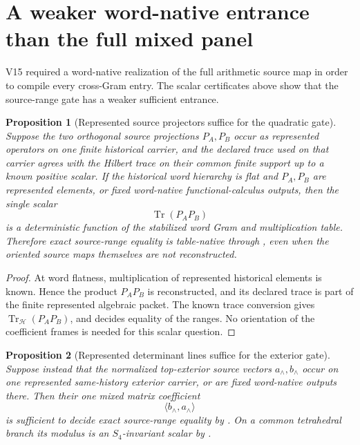 \documentclass[11pt]{article}
\newtheorem{proposition}[proposition]{Proposition}
\theoremstyle{definition}
\theoremstyle{remark}
\newcommand{\Tr}{\operatorname{Tr}}
\begin{document}
\section{A weaker word-native entrance than the full mixed panel}
\label{sec:v16-projector-word}

V15 required a word-native realization of the full arithmetic source map in
order to compile every cross-Gram entry.  The scalar certificates above show
that the source-range gate has a weaker sufficient entrance.

\begin{proposition}[Represented source projectors suffice for the quadratic gate]
\label{prop:v16-projector-native}
Suppose the two orthogonal source projections $P_A,P_B$ occur as represented
operators on one finite historical carrier, and the declared trace used on
that carrier agrees with the Hilbert trace on their common finite support up
to a known positive scalar.  If the historical word hierarchy is flat and
$P_A,P_B$ are represented elements, or fixed word-native functional-calculus
outputs, then the single scalar
\[
 \Tr(P_AP_B)
\]
is a deterministic function of the stabilized word Gram and multiplication
table.  Therefore exact source-range equality is table-native through
, even when the oriented source maps themselves
are not reconstructed.
\end{proposition}

\begin{proof}
At word flatness, multiplication of represented historical elements is known.
Hence the product $P_AP_B$ is reconstructed, and its declared trace is part of
the finite represented algebraic packet.  The known trace conversion gives
$\Tr_{\mathcal H}(P_AP_B)$, and
 decides equality of the ranges.  No
orientation of the coefficient frames is needed for this scalar question.
\end{proof}

\begin{proposition}[Represented determinant lines suffice for the exterior gate]
\label{prop:v16-det-native}
Suppose instead that the normalized top-exterior source vectors
$a_\wedge,b_\wedge$ occur on one represented same-history exterior carrier,
or are fixed word-native outputs there.  Then their one mixed matrix
coefficient
\[
 \langle b_\wedge,a_\wedge\rangle
\]
is sufficient to decide exact source-range equality by
.  On a common tetrahedral branch its modulus is an
$S_4$-invariant scalar by .
\end{proposition}
\end{document}
